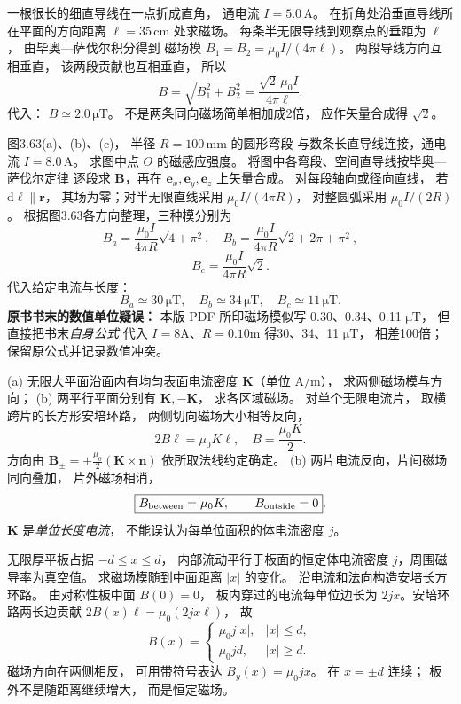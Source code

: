 一根很长的细直导线在一点折成直角，
通电流 $I=5.0\,\mathrm A$。
在折角处沿垂直导线所在平面的方向距离
$\ell=35\,\mathrm{cm}$ 处求磁场。
\exsolution
每条半无限导线到观察点的垂距为 $\ell$，
由毕奥—萨伐尔积分得到
磁场模
$B_1=B_2=\mu_0I/(4\pi\ell)$。
两段导线方向互相垂直，
该两段贡献也互相垂直，
所以
\[
\boxed{B=\sqrt{B_1^2+B_2^2}
=\frac{\sqrt2\,\mu_0I}{4\pi\ell}}.
\]
代入：
$\boxed{B\simeq2.0\,\mathrm{\mu T}}$。
\excheck 不是两条同向磁场简单相加成2倍，
应作矢量合成得 $\sqrt2$。

图3.63(a)、(b)、(c)，
半径 $R=100\,\mathrm{mm}$ 的圆形弯段
与数条长直导线连接，通电流
$I=8.0\,\mathrm A$。
求图中点 $O$ 的磁感应强度。
\exsolution
将图中各弯段、空间直导线按毕奥—萨伐尔定律
逐段求 $\bm B$，再在
$\bm e_x,\bm e_y,\bm e_z$ 上矢量合成。
对每段轴向或径向直线，
若 $\mathrm d\bm\ell\parallel\bm r$，
其场为零；对半无限直线采用
$\mu_0I/(4\pi R)$，
对整圆弧采用 $\mu_0I/(2R)$。
根据图3.63各方向整理，三种模分别为
\[
\boxed{B_a=\frac{\mu_0I}{4\pi R}\sqrt{4+\pi^2}},
\quad
\boxed{B_b=\frac{\mu_0I}{4\pi R}
\sqrt{2+2\pi+\pi^2}},
\]
\[
\boxed{B_c=\frac{\mu_0I}{4\pi R}\sqrt2}.
\]
代入给定电流与长度：
\[
\boxed{B_a\simeq30\,\mathrm{\mu T},\quad
B_b\simeq34\,\mathrm{\mu T},\quad
B_c\simeq11\,\mathrm{\mu T}}.
\]
\excheck \textbf{原书书末的数值单位疑误：}
本版 PDF 所印磁场模似写
0.30、0.34、0.11 $\mathrm{\mu T}$，
但直接把书末\emph{自身公式}
代入 $I=8$A、$R=0.10$m
得30、34、11 $\mathrm{\mu T}$，
相差100倍；保留原公式并记录数值冲突。

(a) 无限大平面沿面内有均匀表面电流密度
$\bm K$（单位 $\mathrm{A/m}$），
求两侧磁场模与方向；
(b) 两平行平面分别有 $\bm K,-\bm K$，
求各区域磁场。
\exsolution
对单个无限电流片，
取横跨片的长方形安培环路，
两侧切向磁场大小相等反向，
\[
2B\ell=\mu_0K\ell,
\quad\boxed{B=\frac{\mu_0K}{2}}.
\]
方向由
$\bm B_\pm=\pm\frac{\mu_0}{2}
(\bm K\times\bm n)$
依所取法线约定确定。
(b) 两片电流反向，片间磁场同向叠加，
片外磁场相消，
\[
\boxed{B_{\rm between}=\mu_0K,\qquad
B_{\rm outside}=0}.
\]
\excheck $\bm K$ 是\emph{单位长度电流}，
不能误认为每单位面积的体电流密度 $j$。

无限厚平板占据
$-d\le x\le d$，
内部流动平行于板面的恒定体电流密度
$j$，周围磁导率为真空值。
求磁场模随到中面距离 $|x|$ 的变化。
\exsolution
沿电流和法向构造安培长方环路。
由对称性板中面 $B(0)=0$，
板内穿过的电流每单位边长为
$2jx$。安培环路两长边贡献
$2B(x)\ell=\mu_0(2jx\ell)$，
故
\[
\boxed{B(x)=
\begin{cases}
\mu_0j|x|,& |x|\le d,\\
\mu_0jd,& |x|\ge d.
\end{cases}}
\]
磁场方向在两侧相反，
可用带符号表达
$B_y(x)=\mu_0jx$。
\excheck 在 $x=\pm d$ 连续；
板外不是随距离继续增大，
而是恒定磁场。

